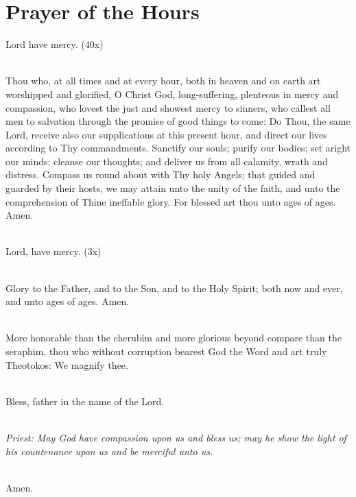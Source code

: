 {\section*{Prayer of the Hours}
Lord have mercy. (40x)

\mbox{}\\
Thou who, at all times and at every hour, both in heaven and on earth art 
worshipped and glorified, O Christ God, long-suffering, plenteous in mercy 
and compassion, who lovest the just and showest mercy to sinners, who callest 
all men to salvation through the promise of good things to come: Do Thou, the 
same Lord, receive also our supplications at this present hour, and direct our 
lives according to Thy commandments. Sanctify our souls; purify our bodies; 
set aright our minds; cleanse our thoughts; and deliver us from all calamity, 
wrath and distress. Compass us round about with Thy holy Angels; that 
guided and guarded by their hosts, we may attain unto the unity of the faith, 
and unto the comprehension of Thine ineffable glory. For blessed art thou unto 
ages of ages. Amen.

\mbox{}\\
Lord, have mercy. (3x)

\mbox{}\\
Glory to the Father, and to the Son, and to the Holy Spirit;
both now and ever, and unto ages of ages. Amen. 

\mbox{}\\
More honorable than the cherubim and more glorious beyond compare than 
the seraphim, thou who without corruption bearest God the Word and art truly 
Theotokos: We magnify thee.

\mbox{}\\
Bless, father in the name of the Lord. 

\mbox{}\\
\emph{Priest: May God have compassion upon us and bless us;
may he show the light of his countenance upon us and be merciful unto us.}

\mbox{}\\
Amen. 

}
